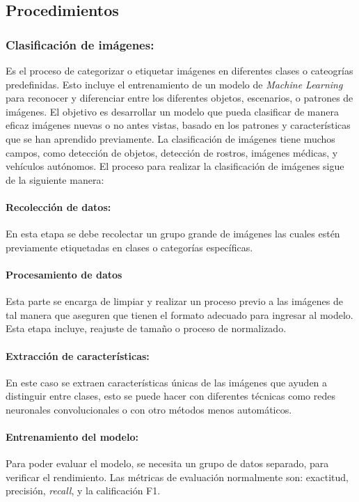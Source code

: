 \subsection*{Procedimientos}
\subsubsection*{Clasificación de imágenes:}

Es el proceso de categorizar o etiquetar imágenes en diferentes clases o cateogrías predefinidas. Esto incluye el entrenamiento de un modelo de \textit{Machine Learning} para reconocer y diferenciar entre los diferentes objetos, escenarios, o patrones de imágenes. El objetivo es desarrollar un modelo que pueda clasificar de manera eficaz imágenes nuevas o no antes vistas, basado en los patrones y características que se han aprendido previamente. La clasificación de imágenes tiene muchos campos, como detección de objetos, detección de rostros, imágenes médicas, y vehículos autónomos. El proceso para realizar la clasificación de imágenes sigue de la siguiente manera: 

\paragraph*{Recolección de datos:}
En esta etapa se debe recolectar un grupo grande de imágenes las cuales estén previamente etiquetadas en clases o categorías específicas.\cite{Krizhevsky}
\paragraph*{Procesamiento de datos}
Esta parte se encarga de limpiar y realizar un proceso previo a las imágenes de tal manera que aseguren que tienen el formato adecuado para ingresar al modelo. Esta etapa incluye, reajuste de tamaño o proceso de normalizado. \cite{Krizhevsky}
\paragraph*{Extracción de características:}
En este caso se extraen características únicas de las imágenes que ayuden a distinguir entre clases, esto se puede hacer con diferentes técnicas como redes neuronales convolucionales o con otro métodos menos automáticos. \cite{Krizhevsky}
\paragraph*{Entrenamiento del modelo:}
Para poder evaluar el modelo, se necesita un grupo de datos separado, para verificar el rendimiento. Las métricas de evaluación normalmente son: exactitud, precisión, \textit{recall}, y la calificación F1. \cite{Krizhevsky}
